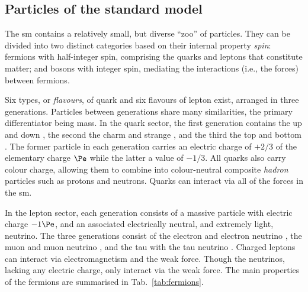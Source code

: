 

\subsection{Particles of the standard model}
\label{subsec:theory_sm_particles}

The \acrlong{sm} contains a relatively small, but diverse ``zoo'' of particles. They can be divided into two distinct categories based on their internal property \emph{spin}: fermions with half-integer spin, comprising the quarks and leptons that constitute matter; and bosons with integer spin, mediating the interactions (i.e., the forces) between fermions.

Six types, or \emph{flavours}, of quark and six flavours of lepton exist, arranged in three generations. Particles between generations share many similarities, the primary differentiator being mass. In the quark sector, the first generation contains the up \Pup and down \Pdown, the second the charm \Pcharm and strange \Pstrange, and the third the top \Ptop and bottom \Pbottom. The former particle in each generation carries an electric charge of $+\text{2/3}$ of the elementary charge $\Pe$ while the latter a value of $-\text{1/3}$. All quarks also carry colour charge, allowing them to combine into colour-neutral composite \emph{hadron} particles such as protons and neutrons. Quarks can interact via all of the forces in the \acrlong{sm}.

In the lepton sector, each generation consists of a massive particle with electric charge $-\text{1}\Pe$, and an associated electrically neutral, and extremely light, neutrino. The three generations consist of the electron \Pe and electron neutrino \Pnue, the muon \Pmu and muon neutrino \Pnum, and the tau \Ptau with the tau neutrino \Pnut. Charged leptons can interact via electromagnetism and the weak force. Though the neutrinos, lacking any electric charge, only interact via the weak force. The main properties of the fermions are summarised in Tab.~\ref{tab:fermions}.


